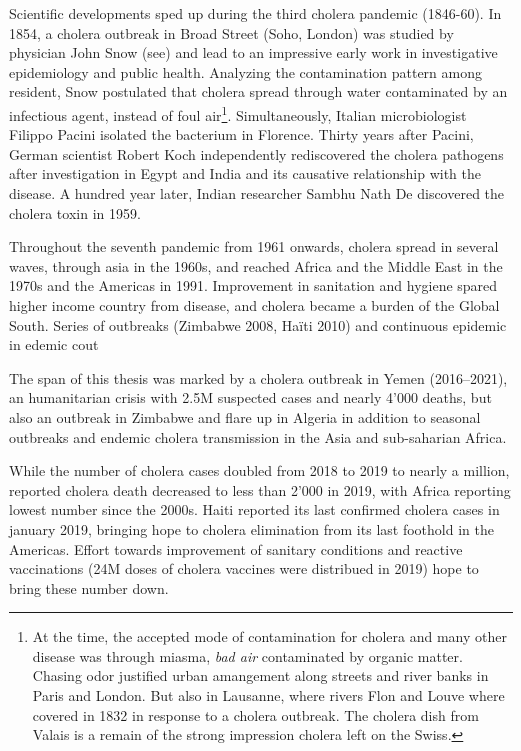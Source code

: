   Scientific developments sped up during the third cholera pandemic (1846-60). In 1854, a cholera outbreak in Broad Street (Soho, London) was studied by physician John Snow (see\textcite{Snow:ModeCommunicationCholera:1855}) and lead to an impressive early work in investigative epidemiology and public health. Analyzing the contamination pattern among resident, Snow postulated that cholera spread through water contaminated by an infectious agent, instead of foul air\footnote{At the time, the accepted mode of contamination for cholera and many other disease was through miasma, \textit{bad air} contaminated by organic matter. Chasing odor  justified urban amangement along streets and river banks in Paris and London. But also in Lausanne, where rivers Flon and Louve where covered in 1832 in response to a cholera outbreak. The cholera dish from Valais is a remain of the strong impression cholera left on the Swiss.}.  Simultaneously, Italian microbiologist Filippo Pacini isolated the bacterium in Florence. Thirty years after Pacini, German scientist Robert Koch independently rediscovered the cholera pathogens after investigation in Egypt and India and its causative relationship with the disease. A hundred year later, Indian researcher Sambhu Nath De discovered the cholera toxin in 1959.

Throughout the seventh pandemic from 1961 onwards, cholera spread in several waves, through asia in the 1960s, and reached Africa and the Middle East in the 1970s and the Americas in 1991\cite{Mutreja:EvidenceSeveralWaves:2011}. Improvement in sanitation and hygiene spared higher income country from disease, and cholera became a burden of the Global South. Series of outbreaks (\eg Zimbabwe 2008, Haïti 2010) and continuous epidemic in edemic cout

The span of this thesis was marked by a cholera outbreak in Yemen (2016--2021), an humanitarian crisis with 2.5M suspected cases and nearly 4'000 deaths, but also an outbreak in Zimbabwe and flare up in Algeria in addition to seasonal outbreaks and endemic cholera transmission in the Asia and sub-saharian Africa.

While the number of cholera cases doubled from 2018 to 2019 to nearly a million, reported cholera death decreased to less than 2'000 in 2019, with Africa reporting lowest number since the 2000s. Haiti reported its last confirmed cholera cases in january 2019, bringing hope to cholera elimination from its last foothold in the Americas. Effort towards improvement of sanitary conditions and reactive vaccinations (24M doses of cholera vaccines were distribued in 2019) hope to bring these number down\cite{WHO:Cholera2019:2020}. 

